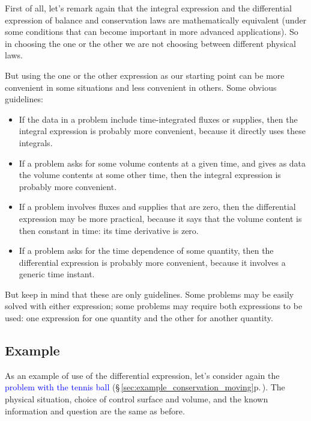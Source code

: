 \documentclass[a4paper,12pt,%
onecolumn,oneside,%
british%
]{memoir}
\renewcommand*{\|}[1][]{\nonscript\:#1\vert\nonscript\:\mathopen{}}
\newcommand*{\sect}{\S}%
\renewcommand*{\autoref}[3][\sect\,\ref]{\textcolor{blue}{#3} {\color{blue}\scriptsize(\faIcon[regular]{eye}\;#1{#2}\;p.\,\pageref{#2})}}
\begin{document}
First of all, let's remark again that the integral expression and the differential expression of balance and conservation laws are mathematically equivalent (under some conditions that can become important in more advanced applications). So in choosing the one or the other we are not choosing between different physical laws.

But using the one or the other expression as our starting point can be more convenient in some situations and less convenient in others. Some obvious guidelines:
\begin{itemize}
\item If the data in a problem include time-integrated fluxes or supplies, then the integral expression is probably more convenient, because it directly uses these integrals.
\item If a problem asks for some volume contents at a given time, and gives as data the volume contents at some other time, then the integral expression is probably more convenient.

  \smallskip

\item If a problem involves fluxes and supplies that are zero, then the differential expression may be more practical, because it says that the volume content is then constant in time: its time derivative is zero.
\item If a problem asks for the time dependence of some quantity, then the differential expression is probably more convenient, because it involves a generic time instant.
\end{itemize}
But keep in mind that these are only guidelines. Some problems may be easily solved with either expression; some problems may require both expressions to be used: one expression for one quantity and the other for another quantity.

\subsection{Example}
\label{sec:example_diff}

As an example of use of the differential expression, let's consider again the \autoref{sec:example_conservation_moving}{problem with the tennis ball}. The physical situation, choice of control surface and volume, and the known information and question are the same as before.
\end{document}
